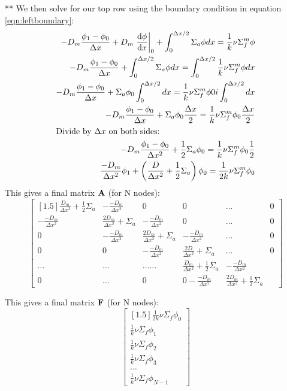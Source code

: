 \documentclass[../main.tex]{subfiles}
\begin{document}
	**
	We then solve for our top row using the boundary condition in equation \ref{eqn:leftboundary}: 
	\begin{align*}
		-D_m \frac{\phi_1 - \phi_0}{\Delta x} + D_m \left. \dv{\phi}{x} \right|_0 + \int_0^{\Delta x / 2} 
			\Sigma_a \phi dx =   \frac{1}{k} \nu \Sigma^m_f \phi \\
		-D_m \frac{\phi_1 - \phi_0}{\Delta x} +  \int_0^{\Delta x / 2} 
			\Sigma_a \phi dx = \int_0^{\Delta x / 2}  \frac{1}{k} \nu \Sigma^m_f \phi dx \\
		-D_m \frac{\phi_1 - \phi_0}{\Delta x} + \Sigma_a \phi_0 \int_0^{\Delta x / 2}
			dx = \frac{1}{k} \nu \Sigma^m_f \phi0i \int_0^{\Delta x / 2} dx \\
			-D_m \frac{\phi_1 - \phi_0}{\Delta x} + \Sigma_a \phi_0  \frac{\Delta x}{2} = \frac{1}{k} \nu \Sigma^m_f \phi_0 \frac{\Delta x}{2} \\
	\intertext{Divide by $\Delta x$ on both sides:}
		-D_m \frac{\phi_1 - \phi_0}{\Delta x^2}  + \frac{1}{2} \Sigma_a \phi_0 =  \frac{1}{k} \nu \Sigma^m_f \phi_0 \frac{1}{2} \\
		\frac{-D_m}{\Delta x^2} \phi_1 + \left( \frac{D}{\Delta x^2} + \frac{1}{2} \Sigma_a \right) \phi_0 = \frac{1}{2k} \nu \Sigma^m_f \phi_0
	\end{align*}
	This gives a final matrix $\mathbf{A}$ (for N nodes):
	\[
	\begin{bmatrix}[1.5]
		\frac{D_m}{\Delta x^2} + \frac{1}{2}\Sigma_a & - \frac{-D_m}{\Delta x^2} & 0 & 0 & \dots & 0\\
		- \frac{-D_m}{\Delta x^2} & \frac{2D_m}{\Delta x^2} + \Sigma_a & - \frac{-D_m}{\Delta x^2} & 0 & \dots & 0 \\
		0 & - \frac{-D_m}{\Delta x^2} & \frac{2D_m}{\Delta x^2} + \Sigma_a & - \frac{-D_m}{\Delta x^2} & \dots & 0 \\
		0 & 0 & - \frac{-D_m}{\Delta x^2} & \frac{2D}{\Delta x^2} + \Sigma_a & \dots & 0 \\
		\dots & \dots & \dots \dots & \frac{D_m}{\Delta x^2} + \frac{1}{2}\Sigma_a & - \frac{-D_m}{\Delta x^2} \\
		0 & \dots & 0 & 0 - \frac{-D_m}{\Delta x^2} & \frac{2 D_m}{\Delta x^2} + \frac{1}{2}\Sigma_a
	\end{bmatrix}
	\]


This gives a final matrix $\mathbf{F}$ (for N nodes):
	\[
	\begin{bmatrix}[1.5]
		\frac{1}{2k} \nu \Sigma_f \phi_0  \\
		\frac{1}{k} \nu \Sigma_f \phi_1  \\
		\frac{1}{k} \nu \Sigma_f \phi_2  \\
		\frac{1}{k} \nu \Sigma_f \phi_3  \\
		\dots \\
		\frac{1}{k} \nu \Sigma_f \phi_{N-1}
	\end{bmatrix}
	\]
	
\end{document}
